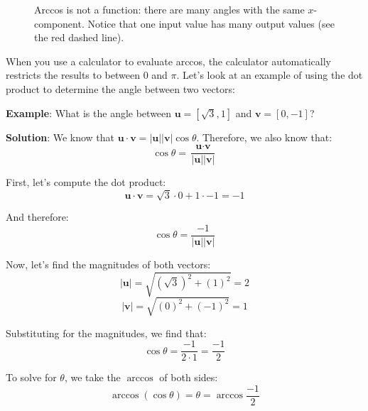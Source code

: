 \begin{figure}[H]
    \centering
    \caption{Arccos is not a function: there are many angles with the same 
    $x$-component. Notice that one input value has many output values (see the 
    red dashed line).}
    \label{fig:arccos}
\end{figure}

When you use a calculator to evaluate arccos, the calculator automatically 
restricts the results to between $0$ and $\pi$. Let's look at an example of 
using the dot product to determine the angle between two vectors:

\textbf{Example}: What is the angle between $\textbf{u} = \left[ \sqrt{3}, 1 
\right]$ and $\textbf{v} = \left[ 0, -1 \right]$?

\textbf{Solution}: We know that $\textbf{u} \cdot \textbf{v} = \left| 
\textbf{u} \right| \left| \textbf{v} \right| \cos{\theta}$. Therefore, we also 
know that:
$$\cos{\theta} = \frac{\textbf{u} \cdot \textbf{v}}{\left| \textbf{u} \right| 
\left| \textbf{v} \right|}$$

First, let's compute the dot product:
$$\textbf{u} \cdot \textbf{v} = \sqrt{3} \cdot 0 + 1 \cdot -1 = -1$$

And therefore:
$$\cos{\theta} = \frac{-1}{\left| \textbf{u} \right| \left| \textbf{v} 
\right|}$$

Now, let's find the magnitudes of both vectors:
$$\left| \textbf{u} \right| = \sqrt{\left( \sqrt{3} \right)^2 + \left( 1 
\right)^2} = 2$$
$$\left| \textbf{v} \right| = \sqrt{\left( 0 \right)^2 + \left( -1 \right)^2} 
= 1$$

Substituting for the magnitudes, we find that:
$$\cos{\theta} = \frac{-1}{2 \cdot 1} = \frac{-1}{2}$$

To solve for $\theta$, we take the $\arccos$ of both sides:
$$\arccos{ \left( \cos{\theta} \right)} = \theta = \arccos{ \frac{-1}{2} }$$

